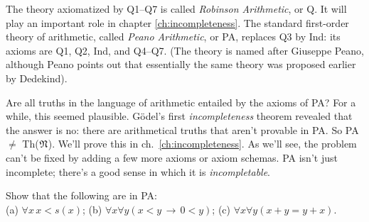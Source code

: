 
The theory axiomatized by Q1--Q7 is called \emph{Robinson Arithmetic}, or Q.
It will play an important role in chapter \ref{ch:incompleteness}.
The standard first-order theory of arithmetic,
called \emph{Peano Arithmetic}, or PA,
replaces Q3 by Ind:
its axioms are Q1, Q2, Ind, and Q4--Q7.
(The theory is named after Giuseppe Peano,
although Peano points out that
essentially the same theory was proposed earlier by Dedekind).

Are all truths in the language of arithmetic entailed by the axioms of PA?
For a while,
this seemed plausible.
Gödel's first \emph{incompleteness} theorem
revealed that the answer is no:
there are arithmetical truths
that aren't provable in PA.
So PA $\ne$ Th($\mathfrak{N}$).
We'll prove this in ch.~\ref{ch:incompleteness}.
As we'll see,
the problem can't be fixed by adding a few more axioms or axiom schemas.
PA isn't just incomplete;
there's a good sense in which it is \emph{incompletable}.

\begin{exercise}
  Show that the following are in PA:\\
  (a) $\forall x\, x < s(x)$; \;
  (b) $\forall x \forall y (x < y \,\to\, 0 < y)$; \;
  (c) $\forall x \forall y(x + y = y + x)$.
\end{exercise}



